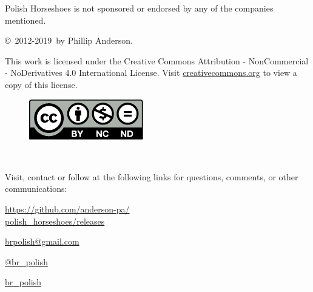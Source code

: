 \documentclass[11pt,letterpaper,twocolumn,english,DIV=calc]{scrartcl}
\newcommand{\currentyear}{2019}
\begin{document}
\medskip{}\noindent Polish Horseshoes is not sponsored or endorsed by any of the companies mentioned.


\copyright\ 2012-\currentyear\ by Phillip Anderson. 

\noindent This work is licensed under the Creative Commons Attribution
- NonCommercial - NoDerivatives 4.0 International License. 
Visit \href{http://creativecommons.org/licenses/by-nc-nd/4.0/}{creativecommons.org} to view a copy of this license.

\begin{figure}[!h]
	\includegraphics[width=\columnwidth]{images/by-nc-nd}
\end{figure}

\newpage{}

\ \vfill{}

\noindent Visit, contact or follow at the following links for questions, comments, or other communications:

\begin{description}[listparindent=1.cm, font=\normalfont]
	\item[{\faGlobe}] \href{https://github.com/anderson-pa/polish_horseshoes/releases}{https://github.com/anderson-pa/\\\indent polish\_horseshoes/releases}

	\item[\faEnvelopeO] \href{mailto:brpolish@gmail.com}{brpolish@gmail.com}

	\item[\faTwitter] \href{http://www.twitter.com/br_polish}{@br\_{}polish}

	\item[\faTwitch] \href{http://www.twitch.tv/br_polish}{br\_{}polish}
\end{description}
\end{document}
